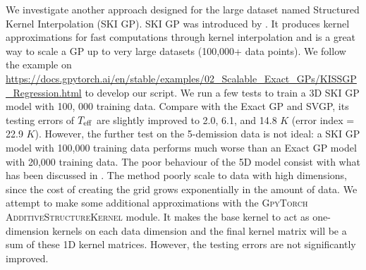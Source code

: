We investigate another approach designed for the large dataset named Structured Kernel Interpolation (SKI GP). SKI GP was introduced by \citet{wilson2015kernel}. It produces kernel approximations for fast computations through kernel interpolation and is a great way to scale a GP up to very large datasets (100,000+ data points). We follow the example on \url{https://docs.gpytorch.ai/en/stable/examples/02_Scalable_Exact_GPs/KISSGP_Regression.html} to develop our script. We run a few tests to train a 3D SKI GP model with 100, 000 training data. Compare with the Exact GP and SVGP, its testing errors of $T_{\rm eff}$ are slightly improved to 2.0, 6.1, and 14.8 $K$ (error index = 22.9 $K$). However, the further test on the 5-demission data is not ideal: a SKI GP model with 100,000 training data performs much worse than an Exact GP model with 20,000 training data. The poor behaviour of the 5D model consist with what has been discussed in \citet{wilson2015kernel}. The method poorly scale to data with high dimensions, since the cost of creating the grid grows exponentially in the amount of data. We attempt to make some additional approximations with the \textsc{GpyTorch AdditiveStructureKernel} module. It makes the base kernel to act as one-dimension kernels on each data dimension and the final kernel matrix will be a sum of these 1D kernel matrices. However, the testing errors are not significantly improved.

